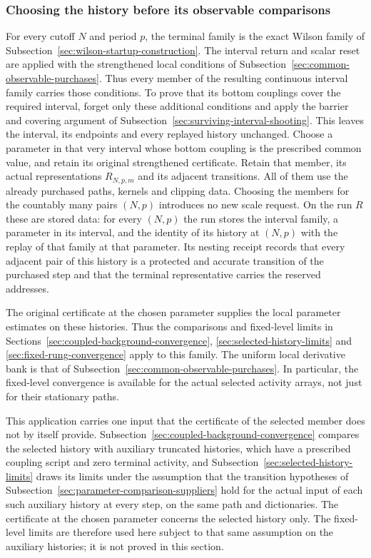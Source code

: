 \subsubsection{Choosing the history before its observable comparisons}
For every cutoff $N$ and period $p$, the terminal family is the exact
Wilson family of Subsection~\ref{sec:wilson-startup-construction}.
The interval return and scalar reset are applied with the strengthened
local conditions of Subsection~\ref{sec:common-observable-purchases}.
Thus every member of the resulting continuous interval family carries
those conditions. To prove that its bottom couplings cover the required
interval, forget only these additional conditions and apply the barrier
and covering argument of Subsection~\ref{sec:surviving-interval-shooting}.
This leaves the interval, its endpoints and every replayed history
unchanged. Choose a parameter in that very interval whose bottom
coupling is the prescribed common value, and retain its original
strengthened certificate.
Retain that member, its actual representations $R_{N,p,m}$ and its
adjacent transitions. All of them use the already purchased paths,
kernels and clipping data. Choosing the members for the countably
many pairs $(N,p)$ introduces no new scale request. On the run $R$ these
are stored data: for every $(N,p)$ the run stores the interval family, a
parameter in its interval, and the identity of its history at $(N,p)$
with the replay of that family at that parameter. Its nesting receipt
records that every adjacent pair of this history is a protected and
accurate transition of the purchased step and that the terminal
representative carries the reserved addresses.

The original certificate at the chosen parameter supplies the local
parameter estimates on these histories. Thus the comparisons and fixed-level limits in
Sections~\ref{sec:coupled-background-convergence},
\ref{sec:selected-history-limits} and
\ref{sec:fixed-rung-convergence} apply to this family. The uniform
local derivative bank is that of
Subsection~\ref{sec:common-observable-purchases}. In particular, the
fixed-level convergence is available for the actual selected
activity arrays, not just for their stationary paths.

This application carries one input that the certificate of the
selected member does not by itself provide.
Subsection~\ref{sec:coupled-background-convergence} compares the selected
history with auxiliary truncated histories, which have a prescribed
coupling script and zero terminal activity, and
Subsection~\ref{sec:selected-history-limits} draws its limits under the
assumption that the transition hypotheses of
Subsection~\ref{sec:parameter-comparison-suppliers} hold for the actual
input of each such auxiliary history at every step, on the same path
and dictionaries. The certificate at the chosen parameter concerns
the selected history only. The fixed-level limits are therefore used
here subject to that same assumption on the auxiliary histories; it
is not proved in this section.

